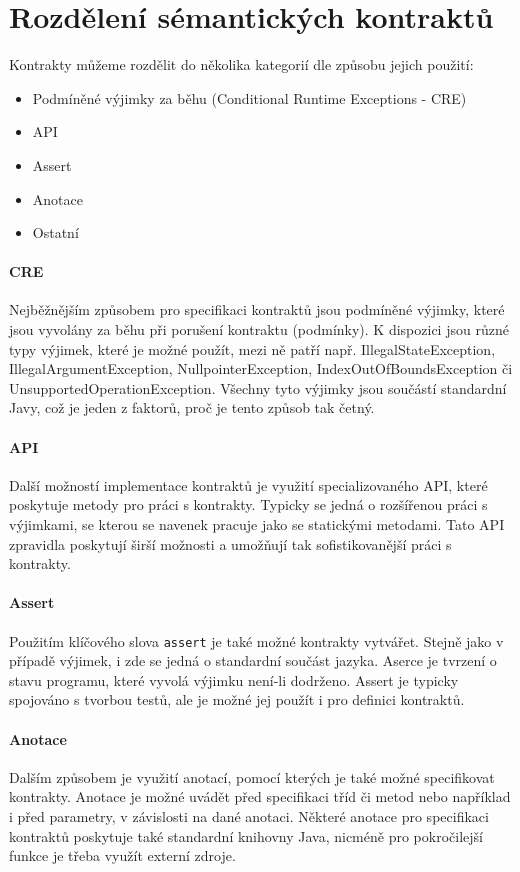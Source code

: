 	\section{Rozdělení sémantických kontraktů}
		Kontrakty můžeme rozdělit do několika kategorií dle způsobu jejich použití:
			
		\begin{itemize}
			\item Podmíněné výjimky za běhu (Conditional Runtime Exceptions - CRE)
			\item API
			\item Assert
			\item Anotace
			\item Ostatní
		\end{itemize}				
		
		\paragraph{CRE}
		 Nejběžnějším způsobem pro specifikaci kontraktů jsou podmíněné výjimky, které jsou vyvolány za běhu při porušení kontraktu (podmínky). K dispozici jsou různé typy výjimek, které je možné použít, mezi ně patří např. IllegalStateException, IllegalArgumentException, NullpointerException, IndexOutOfBoundsException či UnsupportedOperationException. Všechny tyto výjimky jsou součástí standardní Javy, což je jeden z faktorů, proč je tento způsob tak četný.
		
		\paragraph{API}
		Další možností implementace kontraktů je využití specializovaného API, které poskytuje metody pro práci s kontrakty. Typicky se jedná o rozšířenou práci s výjimkami, se kterou se navenek pracuje jako se statickými metodami. Tato API zpravidla poskytují širší možnosti a umožňují tak sofistikovanější práci s kontrakty.
		
		\paragraph{Assert}
		Použitím klíčového slova \texttt{assert} je také možné kontrakty vytvářet. Stejně jako v případě výjimek, i zde se jedná o standardní součást jazyka. Aserce je tvrzení o stavu programu, které vyvolá výjimku není-li dodrženo. Assert je typicky spojováno s tvorbou testů, ale je možné jej použít i pro definici kontraktů.
		
		\paragraph{Anotace}
		Dalším způsobem je využití anotací, pomocí kterých je také možné specifikovat kontrakty. Anotace je možné uvádět před specifikaci tříd či metod nebo například i před parametry, v závislosti na dané anotaci. Některé anotace pro specifikaci kontraktů poskytuje také standardní knihovny Java, nicméně pro pokročilejší funkce je třeba využít externí zdroje.
		
